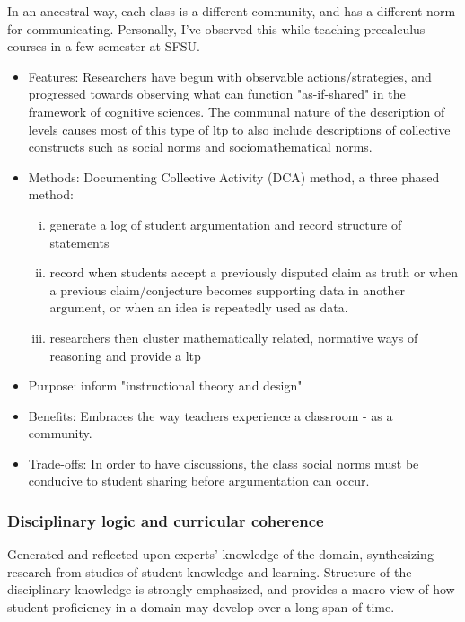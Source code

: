 \documentclass{TC}
\begin{document}
 \begin{remark}
  In an ancestral way, each class is a different community, and has a different norm for communicating. Personally, I've observed this while teaching precalculus courses in a few semester at SFSU.
 \end{remark}
\begin{multicols}{2}
\begin{itemize}
\item Features: Researchers have begun with observable actions/strategies, and progressed towards observing what can function "as-if-shared" in the framework of cognitive sciences. The communal nature of the description of levels  causes most of this type of \gls{ltp} to also include descriptions of collective constructs such as social norms and sociomathematical norms.
\item Methods: Documenting Collective Activity (DCA) method, a three phased method:
\begin{enumerate}[(i)]
\item generate a log of student argumentation and record structure of statements
\item record when students accept a previously disputed claim as truth or when a previous claim/conjecture becomes supporting data in another argument, or when an idea is repeatedly used as data.
\item researchers then cluster mathematically related, normative ways of reasoning and provide a \gls{ltp}
\end{enumerate}

\item Purpose: inform "instructional theory and design" 
\item Benefits: Embraces the way teachers experience a classroom - as a community.
\item Trade-offs: In order to have discussions, the class social norms must be conducive to student sharing before argumentation can occur.
 \end{itemize}
 \end{multicols}
 
 
\subsubsection{Disciplinary logic and curricular coherence}\label{disciplinary_logic}

 Generated and reflected upon experts' knowledge of the domain, synthesizing research from studies of student knowledge and learning. Structure of the disciplinary knowledge is strongly emphasized, and provides a macro view of how student proficiency in a domain may develop over a long span of time. 
 
\end{document}
